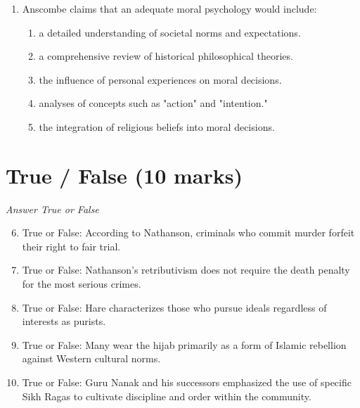 \documentclass[12pt]{article}
\begin{document}
\begin{enumerate}[label=\arabic*.]
as the act or practice of killing or allowing someone to die?
\begin{enumerate}[label=(\alph*)]
    \item murder
    \item ethical killing
    \item suicide
    \item euthanasia
\end{enumerate}
\item Anscombe claims that an adequate moral psychology would include:
\begin{enumerate}[label=(\alph*)]
    \item a detailed understanding of societal norms and expectations.
    \item a comprehensive review of historical philosophical theories.
    \item the influence of personal experiences on moral decisions.
    \item analyses of concepts such as "action" and "intention."
    \item the integration of religious beliefs into moral decisions.
\end{enumerate}
\end{enumerate}

\section*{True / False (10 marks)}
\textit{Answer True or False}
\begin{enumerate}[label=\arabic*.]
\setcounter{enumi}{5}
\item True or False: According to Nathanson, criminals who commit murder forfeit their right to fair trial.
\item True or False: Nathanson's retributivism does not require the death penalty for the most serious crimes.
\item True or False: Hare characterizes those who pursue ideals regardless of interests as purists.
\item True or False: Many wear the hijab primarily as a form of Islamic rebellion against Western cultural norms.
\item True or False: Guru Nanak and his successors emphasized the use of specific Sikh Ragas to cultivate discipline and order within the community.
\end{enumerate}
\end{document}
